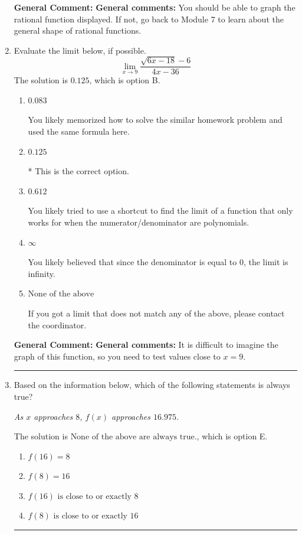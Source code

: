 \documentclass{extbook}[14pt]
\newcommand{\litem}[1]{\item #1

\rule{\textwidth}{0.4pt}}
\begin{document}
\begin{enumerate}
{\begin{enumerate}[label=\Alph*.]
\end{enumerate}

\textbf{General Comment:} \textbf{General comments:} You should be able to graph the rational function displayed. If not, go back to Module 7 to learn about the general shape of rational functions.
}
\litem{
Evaluate the limit below, if possible.
\[ \lim_{x \rightarrow 9} \frac{\sqrt{6x - 18} - 6}{4x - 36} \]The solution is \( 0.125 \), which is option B.\begin{enumerate}[label=\Alph*.]
\item \( 0.083 \)

You likely memorized how to solve the similar homework problem and used the same formula here.
\item \( 0.125 \)

* This is the correct option.
\item \( 0.612 \)

You likely tried to use a shortcut to find the limit of a function that only works for when the numerator/denominator are polynomials.
\item \( \infty \)

You likely believed that since the denominator is equal to 0, the limit is infinity.
\item \( \text{None of the above} \)

If you got a limit that does not match any of the above, please contact the coordinator.
\end{enumerate}

\textbf{General Comment:} \textbf{General comments:} It is difficult to imagine the graph of this function, so you need to test values close to $x = 9$.
}
\litem{
Based on the information below, which of the following statements is always true?

\begin{center}
    \textit{ As $x$ approaches $8$, $f(x)$ approaches $16.975$. }
\end{center}
The solution is \( \text{None of the above are always true.} \), which is option E.\begin{enumerate}[label=\Alph*.]
\item \( f(16) = 8 \)


\item \( f(8) = 16 \)


\item \( f(16) \text{ is close to or exactly } 8 \)


\item \( f(8) \text{ is close to or exactly } 16 \)



\end{enumerate}}
\end{enumerate}
\end{document}
